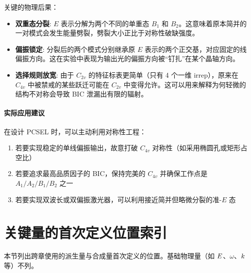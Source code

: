关键的物理后果：
\begin{itemize}
  \item \textbf{双重态分裂}: $E$ 表示分解为两个不同的单重态 $B_1$ 和 $B_2$。这意味着原本简并的一对模式会发生能量劈裂，劈裂大小正比于对称性破缺强度。
  
  \item \textbf{偏振锁定}: 分裂后的两个模式分别继承原 $E$ 表示的两个正交基，对应固定的线偏振方向。这在实验中表现为输出光的偏振方向被“钉扎”在某个晶轴方向。
  
  \item \textbf{选择规则放宽}: 由于 $C_{2v}$ 的特征标表更简单（只有 4 个一维 irrep），原来在 $C_{4v}$ 中被禁戒的某些跃迁可能在 $C_{2v}$ 中变得允许。这可以用来解释为何轻微的结构不对称会导致 BIC 泄漏出有限的辐射。
\end{itemize}

\paragraph{实际应用建议} 在设计 PCSEL 时，可以主动利用对称性工程：
\begin{enumerate}
  \item 若要实现稳定的单线偏振输出，故意打破 $C_{4v}$ 对称性（如采用椭圆孔或矩形占空比）
  \item 若要追求最高品质因子的 BIC，保持完美的 $C_{4v}$ 并确保工作点是 $A_1/A_2/B_1/B_2$ 之一
  \item 若要实现双波长或双偏振激光器，可以利用接近简并但略微分裂的准-$E$ 态
\end{enumerate}


\section{关键量的首次定义位置索引}
本节列出跨章使用的派生量与合成量首次定义的位置。基础物理量（如 $E$、$\omega$、$k$ 等）不列。

